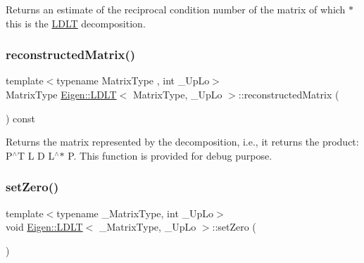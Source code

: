 \begin{DoxyReturn}{Returns}
an estimate of the reciprocal condition number of the matrix of which {\ttfamily $\ast$this} is the \mbox{\hyperlink{class_eigen_1_1_l_d_l_t}{L\+D\+LT}} decomposition. 
\end{DoxyReturn}
\mbox{\label{class_eigen_1_1_l_d_l_t_ae3693372ca29f50d87d324dfadaae148}} 
\subsubsection{\texorpdfstring{reconstructedMatrix()}{reconstructedMatrix()}}
{\footnotesize\ttfamily template$<$typename Matrix\+Type , int \+\_\+\+Up\+Lo$>$ \\
Matrix\+Type \mbox{\hyperlink{class_eigen_1_1_l_d_l_t}{Eigen\+::\+L\+D\+LT}}$<$ Matrix\+Type, \+\_\+\+Up\+Lo $>$\+::reconstructed\+Matrix (\begin{DoxyParamCaption}{ }\end{DoxyParamCaption}) const}

\begin{DoxyReturn}{Returns}
the matrix represented by the decomposition, i.\+e., it returns the product\+: P$^\wedge$T L D L$^\wedge$$\ast$ P. This function is provided for debug purpose. 
\end{DoxyReturn}
\mbox{\label{class_eigen_1_1_l_d_l_t_a776d0ab6c980847297d25b03b5d2216a}} 
\subsubsection{\texorpdfstring{setZero()}{setZero()}}
{\footnotesize\ttfamily template$<$typename \+\_\+\+Matrix\+Type, int \+\_\+\+Up\+Lo$>$ \\
void \mbox{\hyperlink{class_eigen_1_1_l_d_l_t}{Eigen\+::\+L\+D\+LT}}$<$ \+\_\+\+Matrix\+Type, \+\_\+\+Up\+Lo $>$\+::set\+Zero (\begin{DoxyParamCaption}{ }\end{DoxyParamCaption})\hspace{0.3cm}{\ttfamily [inline]}}


